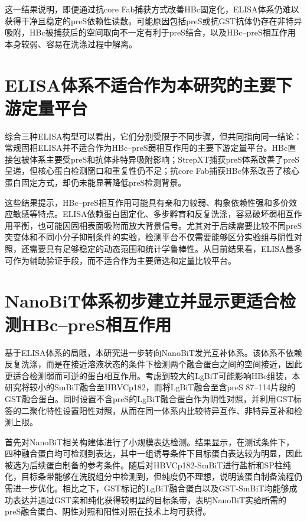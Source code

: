 这一结果说明，即便通过抗core Fab捕获方式改善HBc固定化，ELISA体系仍难以获得干净且稳定的preS依赖性读数。可能原因包括preS或抗GST抗体仍存在非特异吸附，HBc被捕获后的空间取向不一定有利于preS结合，以及HBc--preS相互作用本身较弱、容易在洗涤过程中解离。

\section{ELISA体系不适合作为本研究的主要下游定量平台}

综合三种ELISA构型可以看出，它们分别受限于不同步骤，但共同指向同一结论：常规固相ELISA并不适合作为HBc--preS弱相互作用的主要下游定量平台。HBc直接包被体系主要受preS和抗体非特异吸附影响；StrepXT捕获preS体系改善了preS呈递，但核心蛋白检测窗口和重复性仍不足；抗core Fab捕获HBc体系改善了核心蛋白固定方式，却仍未能显著降低preS检测背景。

这些结果提示，HBc--preS相互作用可能具有亲和力较弱、构象依赖性强和多价效应敏感等特点。ELISA依赖蛋白固定化、多步孵育和反复洗涤，容易破坏弱相互作用平衡，也可能因固相表面吸附而放大背景信号。尤其对于后续需要比较不同preS突变体和不同小分子抑制条件的实验，检测平台不仅需要能够区分实验组与阴性对照，还需要具有足够稳定的动态范围和统计学鲁棒性。从目前结果看，ELISA最多可作为辅助验证手段，而不适合作为主要筛选和定量比较平台。

\section{NanoBiT体系初步建立并显示更适合检测HBc--preS相互作用}

基于ELISA体系的局限，本研究进一步转向NanoBiT发光互补体系。该体系不依赖反复洗涤，而是在接近溶液状态的条件下检测两个融合蛋白之间的空间接近，因此更适合检测弱而可逆的蛋白相互作用。考虑到较大的LgBiT可能影响HBc组装，本研究将较小的SmBiT融合至HBVCp182，而将LgBiT融合至含preS 87--114片段的GST融合蛋白。同时设置不含preS的LgBiT融合蛋白作为阴性对照，并利用GST标签的二聚化特性设置阳性对照，从而在同一体系内比较特异互作、非特异互补和检测上限。

首先对NanoBiT相关构建体进行了小规模表达检测。结果显示，在测试条件下，四种融合蛋白均可检测到表达，其中一组诱导条件下目标蛋白表达较为明显，因此被选为后续蛋白制备的参考条件。随后对HBVCp182-SmBiT进行盐析和SP柱纯化，目标条带能够在洗脱组分中检测到，但纯度仍不理想，说明该蛋白制备流程仍需进一步优化。相比之下，GST标记的LgBiT融合蛋白以及GST-SmBiT均能够成功表达并通过GST亲和纯化获得较明显的目标条带，表明NanoBiT实验所需的preS融合蛋白、阴性对照和阳性对照在技术上均可获得。

